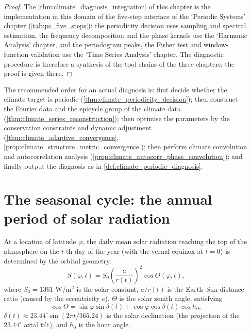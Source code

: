 \begin{proof}
The \cref{thm:climate_diagnosis_integration} of this chapter is the implementation in this domain of the five-step interface of the `Periodic Systems' chapter (\cref{tab:ps_five_steps}):
the periodicity decision uses sampling and spectral estimation, the frequency decomposition and the phase kernels use the `Harmonic Analysis' chapter, and the periodogram peaks, the Fisher test and
window-function validation use the `Time Series Analysis' chapter. The diagnostic procedure is therefore a synthesis of the tool chains of the three chapters; the proof is given there.
\end{proof}

\begin{remark}\label{rem:climate_integration_order}
The recommended order for an actual diagnosis is: first decide whether the climate target is periodic (\cref{thm:climate_periodicity_decision}); then construct the Fourier data and the epicycle group of the climate data (\cref{thm:climate_series_reconstruction}); then optimise the parameters by the conservation constraints and dynamic adjustment (\cref{thm:climate_adaptive_convergence}, \cref{prop:climate_structure_metric_convergence}); then perform climate convolution and autocorrelation analysis (\cref{prop:climate_autocorr_phase_convolution}); and finally output the diagnosis as in \cref{def:climate_periodic_diagnosis}.
\end{remark}

\section{The seasonal cycle: the annual period of solar radiation}

\begin{definition}\label{def:solar_insolation}
At a location of latitude $\varphi$, the daily mean solar radiation reaching the top of the atmosphere on the $t$-th day of the year (with the vernal equinox at $t=0$) is determined by the orbital geometry:
\[
S(\varphi, t) = S_0\left(\frac{a}{r(t)}\right)^2 \cos\Theta(\varphi, t),
\]
where $S_0 = 1361$ W/m$^2$ is the solar constant, $a/r(t)$ is the Earth--Sun distance ratio (caused by the eccentricity $e$), $\Theta$ is the solar zenith angle, satisfying
\[
\cos\Theta = \sin\varphi \sin\delta(t) + \cos\varphi \cos\delta(t) \cos h_0,
\]
$\delta(t) \approx 23.44^\circ \sin(2\pi t/365.24)$ is the solar declination (the projection of the $23.44^\circ$ axial tilt), and $h_0$ is the hour angle.
\end{definition}

